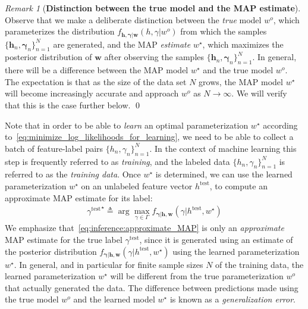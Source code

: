\documentclass[oneside,11pt]{amsart}
\def\w{{\boldsymbol{w}}}
\theoremstyle{remark}
\newtheorem{remark}{Remark}[section]
\begin{document}
{ \begin{remark}[\textbf{Distinction between the true model and the MAP estimate}] Observe that we make a deliberate distinction between the \emph{true} model \( w^o \), which parameterizes the distribution \( f_{\boldsymbol{h}, \boldsymbol{\gamma} | \boldsymbol{w} } \left( h, {\gamma} | w^o \right) \) from which the samples \( \{ \boldsymbol{h}_n, \boldsymbol{\gamma}_n \}_{n=1}^N \) are generated, and the MAP \emph{estimate} \( w^{\star} \), which maximizes the posterior distribution of \( \w \) after observing the samples \( \{ \boldsymbol{h}_n, \boldsymbol{\gamma}_n \}_{n=1}^N \). In general, there will be a difference between the MAP model \( w^{\star} \) and the true model \( w^o \). The expectation is that as the size of the data set \( N \) grows, the MAP model \( w^{\star} \) will become increasingly accurate and approach \( w^o \) as \( N \to \infty \). We will verify that this is the case further below. {\qed}\label{rm:inference:generalization}
\end{remark}
}
Note that in order to be able to \emph{learn} an optimal parameterization \( w^{\star} \) according to~\eqref{eq:minimize_log_likelihoods_for_learning}, we need to be able to collect a batch of feature-label pairs \( \{ h_n, \gamma_n \}_{n=1}^{N} \). In the context of machine learning this step is frequently referred to as \emph{training}, and the labeled data \( \{ h_n, \gamma_n \}_{n=1}^{N} \) is referred to as the \emph{training data}. Once \( w^{\star} \) is determined, we can use the learned parameterization \( w^{\star} \) on an unlabeled feature vector \( h^{\mathrm{test}} \), to compute an approximate MAP estimate for its label:
\begin{align}\label{eq:inference:approximate_MAP}
  {\gamma^{\mathrm{test}}}^{\star} \triangleq \arg\max_{{\gamma} \in \Gamma} f_{\boldsymbol{\gamma}|\boldsymbol{h}, \boldsymbol{w}}(\gamma | h^{\mathrm{test}}, w^{\star})
\end{align}
We emphasize that~\eqref{eq:inference:approximate_MAP} is only an \emph{approximate} MAP estimate for the true label \( {\gamma^{\mathrm{test}}} \), since it is generated using an estimate of the posterior distribution \( f_{\boldsymbol{\gamma}|\boldsymbol{h}, \boldsymbol{w}}(\gamma | h^{\mathrm{test}}, w^{\star}) \) using the learned parameterization~\( w^{\star} \). In general, and in particular for finite sample sizes \( N \) of the training data, the learned parameterization \( w^{\star} \) will be different from the true parameterization \( w^o \) that actually generated the data. The difference between predictions made using the true model \( w^o \) and the learned model \( w^{\star} \) is known as a \emph{generalization error}.
\end{document}
